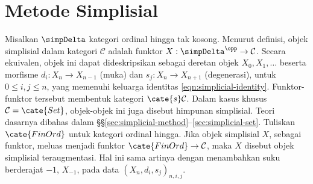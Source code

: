 

\chapter{Metode Simplisial}\label{sec:simplicial}
\hypertarget{o014.aljabr2.chapter8.simplicial-objects}{ }
Misalkan $\simpDelta$ kategori ordinal hingga tak kosong. Menurut definisi,
objek simplisial dalam kategori $\mathcal{C}$ adalah funktor
$X:\simpDelta^{\opp}\to\mathcal{C}$. Secara ekuivalen, objek ini dapat
dideskripsikan sebagai deretan objek $X_0,X_1,\ldots$ beserta morfisme
$d_i:X_n\to X_{n-1}$ (muka) dan $s_j:X_n\to X_{n+1}$ (degenerasi), untuk
$0\leq i,j\leq n$, yang memenuhi keluarga identitas
\eqref{eqn:simplicial-identity}. Funktor-funktor tersebut membentuk kategori
$\cate{s}\mathcal{C}$. Dalam kasus khusus $\mathcal{C}=\cate{Set}$,
objek-objek ini juga disebut himpunan simplisial. Teori dasarnya dibahas
dalam \S\S\ref{sec:simplicial-method}--\ref{sec:simplicial-set}. Tuliskan
$\cate{FinOrd}$ untuk kategori ordinal hingga. Jika objek simplisial $X$,
sebagai funktor, meluas menjadi funktor $\cate{FinOrd}\to\mathcal{C}$, maka
$X$ disebut objek simplisial teraugmentasi. Hal ini sama artinya dengan
menambahkan suku berderajat $-1$, $X_{-1}$, pada data
$(X_n,d_i,s_j)_{n,i,j}$.

